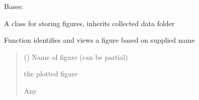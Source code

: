 \documentclass[letterpaper,10pt,english]{sphinxmanual}
\begin{document}
\begin{fulllineitems}
\label{\detokenize{ExperimentHierarchy:ExperimentHierarchy.CollectedFiguresFolder}}
\pysigstartsignatures
{}
\pysigstopsignatures
\sphinxAtStartPar
Bases: {\hyperref[\detokenize{ExperimentHierarchy:ExperimentHierarchy.CollectedDataFolder}]{}}

\sphinxAtStartPar
A class for storing figures, inherits collected data folder

\begin{fulllineitems}
\label{\detokenize{ExperimentHierarchy:ExperimentHierarchy.CollectedFiguresFolder.view_figure}}
\pysigstartsignatures
{}
\pysigstopsignatures
\sphinxAtStartPar
Function identifies and views a figure based on supplied name
\begin{quote}\begin{description}
\sphinxAtStartPar
{} () \textendash{} Name of figure (can be partial)

\sphinxAtStartPar
the plotted figure

\sphinxAtStartPar
Any

\end{description}\end{quote}

\end{fulllineitems}


\end{fulllineitems}

\end{document}
